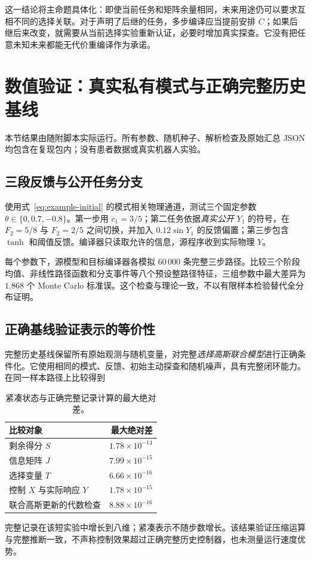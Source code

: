 \documentclass[UTF8,fontset=fandol,11pt,a4paper]{ctexart}
\theoremstyle{definition}
\theoremstyle{remark}
\numberwithin{equation}{section}
\begin{document}
这一结论将主命题具体化：即使当前任务和矩阵余量相同，未来用途仍可以要求互相不同的选择关联。对于声明了后继的任务，多步编译应当提前安排 $C$；如果后继后来改变，就需要从当前选择实验重新认证，必要时增加真实探查。它没有把任意未知未来都能无代价重编译作为承诺。

\section{数值验证：真实私有模式与正确完整历史基线}
\label{sec:new-validation}

本节结果由随附脚本实际运行。所有参数、随机种子、解析检查及原始汇总 JSON 均包含在复现包内；没有患者数据或真实机器人实验。

\subsection{三段反馈与公开任务分支}
使用式~\eqref{eq:example-initial} 的模式相关物理通道，测试三个固定参数 $\theta\in\{0,0.7,-0.8\}$。第一步用 $c_1=3/5$；第二任务依据\emph{真实公开} $Y_1$ 的符号，在 $F_2=5/8$ 与 $F_2=2/5$ 之间切换，并加入 $0.12\sin Y_1$ 的反馈偏置；第三步包含 $\tanh$ 和阈值反馈。编译器只读取允许的信息，源程序收到实际物理 $Y$。

每个参数下，源模型和目标编译器各模拟 $60\,000$ 条完整三步路径。比较三个阶段均值、非线性路径函数和分支事件等八个预设整路径特征，三组参数中最大差异为 $1.868$ 个 Monte Carlo 标准误。这个检查与理论一致，不以有限样本检验替代全分布证明。

\subsection{正确基线验证表示的等价性}
完整历史基线保留所有原始观测与随机变量，对完整\emph{选择高斯联合模型}进行正确条件化。它使用相同的模式、反馈、初始主动探查和随机噪声，具有完整闭环能力。在同一样本路径上比较得到
\begin{table}[htbp]
\centering\small
\caption{紧凑状态与正确完整记录计算的最大绝对差。}
\begin{tabular}{@{}lr@{}}
\toprule
比较对象 & 最大绝对差 \\
\midrule
剩余得分 $S$ & $1.78\times10^{-14}$ \\
信息矩阵 $J$ & $7.99\times10^{-15}$ \\
选择变量 $T$ & $6.66\times10^{-16}$ \\
控制 $X$ 与实际响应 $Y$ & $1.78\times10^{-15}$ \\
联合高斯更新的代数检查 & $8.88\times10^{-16}$ \\
\bottomrule
\end{tabular}
\end{table}
完整记录在该短实验中增长到八维；紧凑表示不随步数增长。该结果验证压缩运算与完整推断一致，不声称控制效果超过正确完整历史控制器，也未测量运行速度优势。
\end{document}
